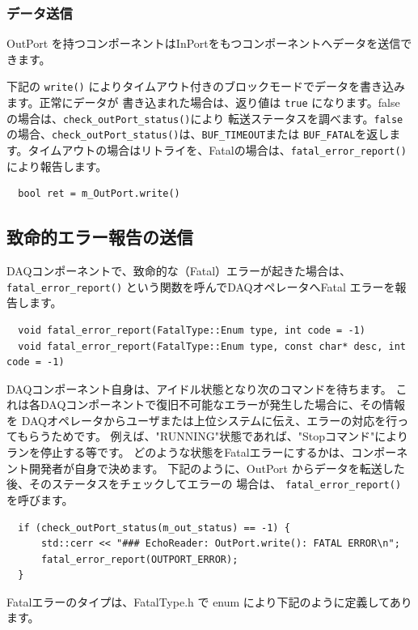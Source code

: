 \documentclass[a4j,10pt,dvips,onecolumn,oneside,final]{jarticle}%
\begin{document}
\subsubsection{データ送信}
OutPort を持つコンポーネントはInPortをもつコンポーネントへデータを送信できます。

下記の \verb|write()| によりタイムアウト付きのブロックモードでデータを書き込みます。正常にデータが
書き込まれた場合は、返り値は \verb|true| になります。false の場合は、\verb|check_outPort_status()|により
転送ステータスを調べます。\verb|false| の場合、\verb|check_outPort_status()|は、\verb|BUF_TIMEOUT|または
\verb|BUF_FATAL|を返します。タイムアウトの場合はリトライを、Fatalの場合は、\verb|fatal_error_report()|
により報告します。
\begin{Verbatim}
  bool ret = m_OutPort.write()
\end{Verbatim}

\subsection{致命的エラー報告の送信}\label{fatal_error}
DAQコンポーネントで、致命的な（Fatal）エラーが起きた場合は、
\verb|fatal_error_report()| という関数を呼んでDAQオペレータへFatal エラーを報告します。

\begin{Verbatim}  
  void fatal_error_report(FatalType::Enum type, int code = -1)
  void fatal_error_report(FatalType::Enum type, const char* desc, int code = -1)
\end{Verbatim}

DAQコンポーネント自身は、アイドル状態となり次のコマンドを待ちます。
これは各DAQコンポーネントで復旧不可能なエラーが発生した場合に、その情報を
DAQオペレータからユーザまたは上位システムに伝え、エラーの対応を行ってもらうためです。
例えば、"RUNNING"状態であれば、"Stopコマンド"によりランを停止する等です。
どのような状態をFatalエラーにするかは、コンポーネント開発者が自身で決めます。
下記のように、OutPort からデータを転送した後、そのステータスをチェックしてエラーの
場合は、 \verb|fatal_error_report()| を呼びます。
\begin{Verbatim}
  if (check_outPort_status(m_out_status) == -1) {
      std::cerr << "### EchoReader: OutPort.write(): FATAL ERROR\n";
      fatal_error_report(OUTPORT_ERROR);
  }
\end{Verbatim}

Fatalエラーのタイプは、FatalType.h で enum により下記のように定義してあります。
\end{document}
